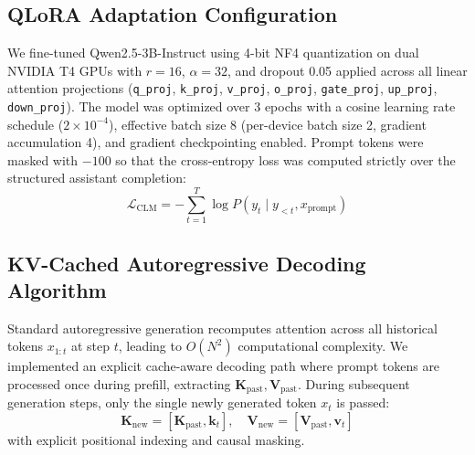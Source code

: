 \documentclass[conference]{IEEEtran}
\begin{document}
\subsection{QLoRA Adaptation Configuration}
We fine-tuned Qwen2.5-3B-Instruct using 4-bit NF4 quantization on dual NVIDIA T4 GPUs with $r=16$, $\alpha=32$, and dropout 0.05 applied across all linear attention projections (\texttt{q\_proj}, \texttt{k\_proj}, \texttt{v\_proj}, \texttt{o\_proj}, \texttt{gate\_proj}, \texttt{up\_proj}, \texttt{down\_proj}). The model was optimized over 3 epochs with a cosine learning rate schedule ($2 \times 10^{-4}$), effective batch size 8 (per-device batch size 2, gradient accumulation 4), and gradient checkpointing enabled. Prompt tokens were masked with $-100$ so that the cross-entropy loss was computed strictly over the structured assistant completion:
\begin{equation}
    \mathcal{L}_{\text{CLM}} = -\sum_{t=1}^{T} \log P(y_t \mid y_{<t}, x_{\text{prompt}})
\end{equation}

\subsection{KV-Cached Autoregressive Decoding Algorithm}
Standard autoregressive generation recomputes attention across all historical tokens $x_{1:t}$ at step $t$, leading to $O(N^2)$ computational complexity. We implemented an explicit cache-aware decoding path where prompt tokens are processed once during prefill, extracting $\mathbf{K}_{\text{past}}, \mathbf{V}_{\text{past}}$. During subsequent generation steps, only the single newly generated token $x_t$ is passed:
\begin{equation}
    \mathbf{K}_{\text{new}} = [\mathbf{K}_{\text{past}}, \mathbf{k}_t], \quad \mathbf{V}_{\text{new}} = [\mathbf{V}_{\text{past}}, \mathbf{v}_t]
\end{equation}
with explicit positional indexing and causal masking.
\end{document}
